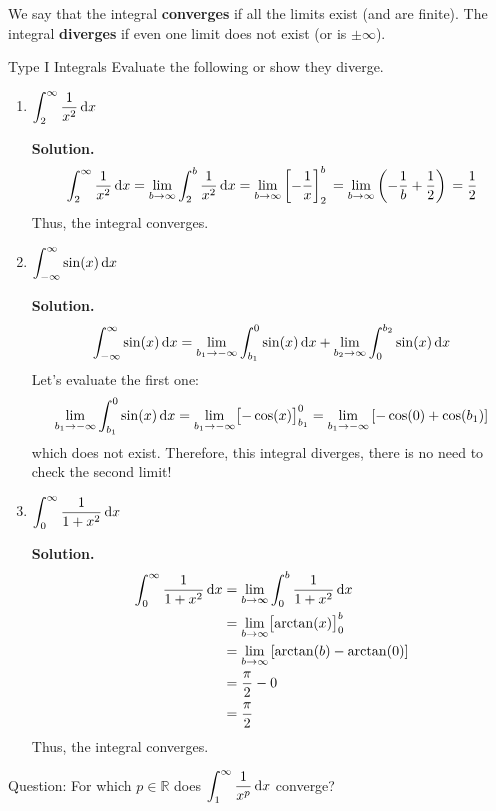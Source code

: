 We say that the integral \textbf{converges} if all the limits exist
(and are finite). The integral \textbf{diverges} if even one limit does
not exist (or is $ \pm\infty $).

\begin{Example}{Type I Integrals}{}
    Evaluate the following or show they diverge.
    \begin{enumerate}[label=(\roman*)]
        \item $ \displaystyle \int_{2}^{\infty} \frac{1}{x^2} \odif{x} $

            \textbf{Solution.}
            \[
                \int_{2}^{\infty} \frac{1}{x^2} \odif{x}
                =\lim\limits_{{b} \to {\infty}} \int_{2}^{b} \frac{1}{x^2} \odif{x}       \\
                = \lim\limits_{{b} \to {\infty}} \left[-\frac{1}{x}  \right]_{2}^b       \\
                =\lim\limits_{{b} \to {\infty}} \left( -\frac{1}{b} +\frac{1}{2} \right) \\
                =\frac{1}{2}
            \]
            Thus, the integral converges.
        \item $ \displaystyle \int_{-\infty}^{\infty} \sin(x)\odif{x} $

            \textbf{Solution.}
            \[
                \int_{-\infty}^{\infty} \sin(x)\odif{x}
                =\lim\limits_{{b_1} \to {-\infty}} \int_{b_1}^{0} \sin(x)\odif{x}
                +\lim\limits_{{b_2} \to {\infty}} \int_{0}^{b_2} \sin(x)\odif{x}
            \]
            Let's evaluate the first one:
            \[ \lim\limits_{{b_1} \to {-\infty}}\int_{b_1}^{0} \sin(x)\odif{x}
                = \lim\limits_{{b_1} \to {-\infty}}\bigl[-\cos(x) \bigr]_{b_1}^0
            =\lim\limits_{{b_1} \to {-\infty}} \left[-\cos(0)+\cos(b_1)\right] \]
            which does not exist. Therefore, this integral
            diverges, there is no need to check the second limit!
        \item $ \displaystyle \int_{0}^{\infty} \frac{1}{1+x^2}\odif{x} $

            \textbf{Solution.}
            \begin{align*}
                \int_{0}^{\infty} \frac{1}{1+x^2}\odif{x}
                & =\lim\limits_{{b} \to {\infty}} \int_{0}^{b} \frac{1}{1+x^2} \odif{x} \\
                & = \lim\limits_{{b} \to {\infty}} \bigl[\arctan(x) \bigr]_{0}^b        \\
                & =\lim\limits_{{b} \to {\infty}} \left[\arctan(b)-\arctan(0) \right]   \\
                & =\frac{\pi}{2} -0                                                     \\
                & =\frac{\pi}{2}
            \end{align*}
            Thus, the integral converges.
    \end{enumerate}
\end{Example}
Question: For which $ p\in\mathbb{R} $ does $ \displaystyle \int_{1}^{\infty} \frac{1}{x^p} \odif{x} $
converge?

